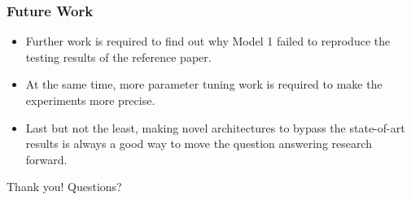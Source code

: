 \documentclass{beamer}
\begin{document}
\begin{frame} \frametitle{Future Work}
    \begin{itemize}
        \item Further work is required to find out why Model 1 failed to reproduce the testing results of the reference paper.
        \item At the same time, more parameter tuning work is required to make the experiments more precise. \item Last but not the least, making novel architectures to bypass the state-of-art results is always a good way to move the question answering research forward.
    \end{itemize}
\end{frame}

\begin{frame}
Thank you! Questions?
\end{frame}
\end{document}
